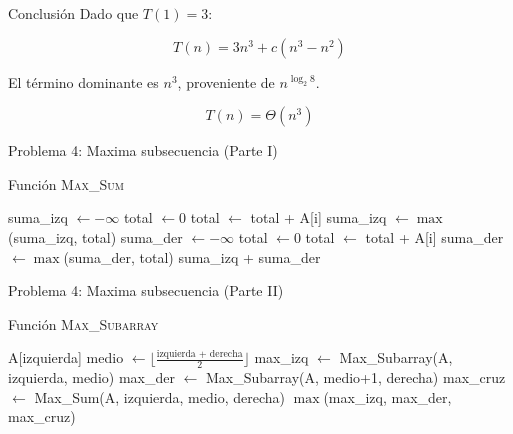\documentclass{beamer}
\begin{document}
\begin{frame}{Conclusión}
Dado que $T(1)=3$:

\[
T(n) = 3n^3 + {c}(n^3 - n^2)
\]

El término dominante es $n^3$, proveniente de $n^{\log_2 8}$.

\[
\boxed{T(n) = \Theta(n^3)}
\]

\bigskip

\end{frame}














\begin{frame}{Problema 4: Maxima subsecuencia (Parte I)}
\begin{algorithm}[H]
\caption{Función \textsc{Max\_Sum}}
\begin{algorithmic}[1]
  \State suma\_izq $\gets -\infty$
  \State total $\gets 0$
    \State total $\gets$ total + A[i]
    \State suma\_izq $\gets \max$(suma\_izq, total)
  \EndFor
  \State suma\_der $\gets -\infty$
  \State total $\gets 0$
    \State total $\gets$ total + A[i]
    \State suma\_der $\gets \max$(suma\_der, total)
  \EndFor
  \State \Return suma\_izq + suma\_der
\EndFunction
\end{algorithmic}
\end{algorithm}
\end{frame}

\begin{frame}{Problema 4: Maxima subsecuencia (Parte II)}
\begin{algorithm}[H]
\caption{Función \textsc{Max\_Subarray}}
\begin{algorithmic}[1]
    \State \Return A[izquierda]
  \EndIf
  \State medio $\gets \lfloor \tfrac{\text{izquierda + derecha}}{2} \rfloor$
  \State max\_izq $\gets$ Max\_Subarray(A, izquierda, medio)
  \State max\_der $\gets$ Max\_Subarray(A, medio+1, derecha)
  \State max\_cruz $\gets$ Max\_Sum(A, izquierda, medio, derecha)
  \State \Return $\max$(max\_izq, max\_der, max\_cruz)
\EndFunction
\end{algorithmic}
\end{algorithm}
\end{frame}
\end{document}
